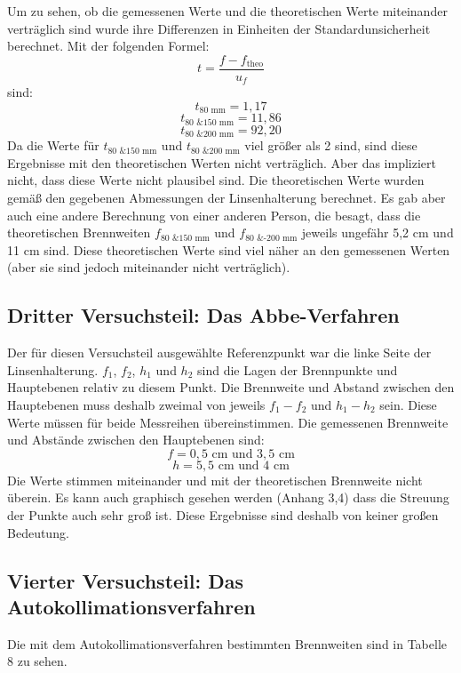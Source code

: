 \documentclass[11pt,a4paper]{article}
\begin{document}
Um zu sehen, ob die gemessenen Werte und die theoretischen Werte miteinander verträglich sind wurde ihre Differenzen in Einheiten der Standardunsicherheit berechnet. Mit der folgenden Formel:
$$ t = \frac{f-f_\textrm{theo}}{u_f}$$
sind:
$$ t_\textrm{80 mm} = 1,17$$
$$ t_\textrm{80 \& 150 mm} = 11,86$$
$$ t_\textrm{80 \& 200 mm} = 92,20$$
Da die Werte für $t_\textrm{80 \& 150 mm}$ und $t_\textrm{80 \& 200 mm}$ viel größer als 2 sind, sind diese Ergebnisse mit den theoretischen Werten nicht verträglich. Aber das impliziert nicht, dass diese Werte nicht plausibel sind. Die theoretischen Werte wurden gemäß den gegebenen Abmessungen der Linsenhalterung berechnet. Es gab aber auch eine andere Berechnung von einer anderen Person, die besagt, dass die theoretischen Brennweiten $f_\textrm{80 \& 150 mm}$ und $f_\textrm{80 \& -200 mm}$ jeweils ungefähr 5,2 cm und 11 cm sind. Diese theoretischen Werte sind viel näher an den gemessenen Werten (aber sie sind jedoch miteinander nicht verträglich). 

\subsection{Dritter Versuchsteil: Das Abbe-Verfahren}
Der für diesen Versuchsteil ausgewählte Referenzpunkt war die linke Seite der Linsenhalterung. $f_1$, $f_2$, $h_1$ und $h_2$ sind die Lagen der Brennpunkte und Hauptebenen relativ zu diesem Punkt. Die Brennweite und Abstand zwischen den Hauptebenen muss deshalb zweimal von jeweils $f_1-f_2$ und $h_1-h_2$ sein. Diese Werte müssen für beide Messreihen übereinstimmen. Die gemessenen Brennweite und Abstände zwischen den Hauptebenen sind:
$$ f = 0,5 \textrm{ cm und }  3,5 \textrm{ cm}$$
$$ h = 5,5 \textrm{ cm und } 4 \textrm{ cm} $$
Die Werte stimmen miteinander und mit der theoretischen Brennweite nicht überein. Es kann auch graphisch gesehen werden (Anhang 3,4) dass die Streuung der Punkte auch sehr groß ist. Diese Ergebnisse sind deshalb von keiner großen Bedeutung. 

\subsection{Vierter Versuchsteil: Das Autokollimationsverfahren}
Die mit dem Autokollimationsverfahren bestimmten Brennweiten sind in Tabelle 8 zu sehen. 
\end{document}
